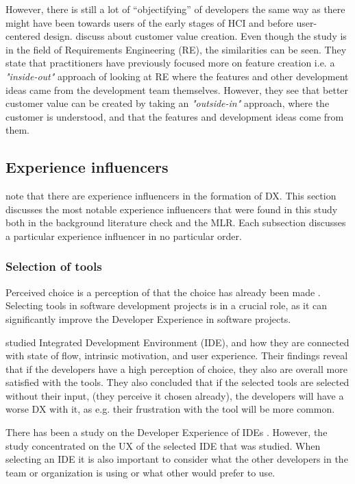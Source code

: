\documentclass[english, 12pt, a4paper, sci, utf8, a-1b, online]{aaltothesis}
\begin{document}
However, there is still a lot of ``objectifying'' of developers the same way as there might have been towards users of the early stages of HCI and before user-centered design. \textcite{kauppinen2009feature} discuss about customer value creation. Even though the study is in the field of Requirements Engineering (RE), the similarities can be seen. They state that practitioners have previously focused more on feature creation i.e. a \textit{"inside-out"} approach of looking at RE where the features and other development ideas came from the development team themselves. However, they see that better customer value can be created by taking an \textit{"outside-in"} approach, where the customer is understood, and that the features and development ideas come from them.

\subsection{Experience influencers}

\textcite{fagerholm-doctoral-thesis} note that there are experience influencers in the formation of DX. This section discusses the most notable experience influencers that were found in this study both in the background literature check and the MLR. Each subsection discusses a particular experience influencer in no particular order.

\subsubsection{Selection of tools}

Perceived choice is a perception of that the choice has already been made \parencite{flow-intrinsic-dx}. Selecting tools in software development projects is in a crucial role, as it can significantly improve the Developer Experience in software projects.

\textcite{flow-intrinsic-dx} studied Integrated Development Environment (IDE), and how they are connected with state of flow, intrinsic motivation, and user experience. Their findings reveal that if the developers have a high perception of choice, they also are overall more satisfied with the tools. They also concluded that if the selected tools are selected without their input, (they perceive it chosen already), the developers will have a worse DX with it, as e.g. their frustration with the tool will be more common.

There has been a study on the Developer Experience of IDEs \parencite{software-developers-as-users}. However, the study concentrated on the UX of the selected IDE that was studied. When selecting an IDE it is also important to consider what the other developers in the team or organization is using or what other would prefer to use.
\end{document}
